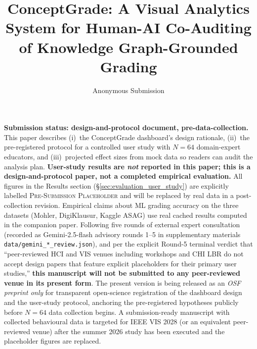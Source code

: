 \documentclass[journal,review]{vgtc}
\title{ConceptGrade: A Visual Analytics System for Human-AI Co-Auditing of Knowledge Graph-Grounded Grading}
\author{Anonymous Submission}
\begin{document}
\maketitle



\noindent\textbf{Submission status: design-and-protocol document,
pre-data-collection.} This paper describes (i)~the ConceptGrade
dashboard's design rationale, (ii)~the pre-registered protocol for a
controlled user study with $N=64$ domain-expert educators, and
(iii)~projected effect sizes from mock data so readers can audit the
analysis plan. \textbf{User-study results are \emph{not} reported in
this paper; this is a design-and-protocol paper, not a completed
empirical evaluation.} All figures in the Results section
(§\ref{sec:evaluation_user_study}) are explicitly labelled
\textsc{Pre-Submission Placeholder} and will be replaced by real data
in a post-collection revision. Empirical claims about ML
grading accuracy on the three datasets (Mohler, DigiKlausur,
Kaggle ASAG) use real cached results computed in the companion paper.
Following five rounds of external expert consultation (recorded as
Gemini-2.5-flash advisory rounds 1--5 in supplementary materials
\texttt{data/gemini\_*\_review.json}), and per the explicit Round-5
terminal verdict that ``peer-reviewed HCI and VIS venues including
workshops and CHI LBR do not accept design papers that feature
explicit placeholders for their primary user studies,'' \textbf{this
manuscript will not be submitted to any peer-reviewed venue in its
present form}. The present version is being released as an
\emph{OSF preprint only} for transparent open-science registration of
the dashboard design and the user-study protocol, anchoring the
pre-registered hypotheses publicly before $N=64$ data collection
begins. A submission-ready manuscript with collected behavioural data
is targeted for IEEE VIS 2028 (or an equivalent peer-reviewed venue)
after the summer 2026 study has been executed and the placeholder
figures are replaced.
\end{document}

